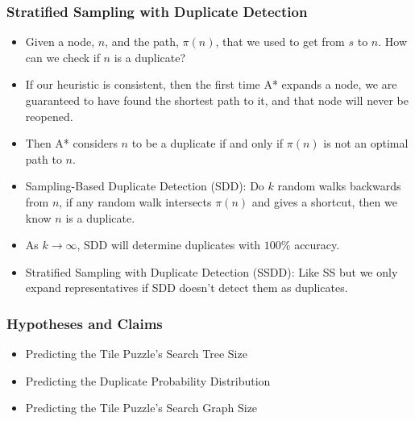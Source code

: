 \documentclass{beamer}
\begin{document}
\begin{frame}
  \frametitle{Stratified Sampling with Duplicate Detection}
  \begin{itemize}
  \item Given a node, \(n\), and the path, \(\pi(n)\), that we used to get from \(s\) to \(n\).
    How can we check if \(n\) is a duplicate?
  \item If our heuristic is consistent, then the first time A* expands a node, we are guaranteed to have found the shortest path to it, and that node will never be reopened.
  \item Then A* considers \(n\) to be a duplicate if and only if \(\pi(n)\) is not an optimal path to \(n\).
  \item Sampling-Based Duplicate Detection (SDD): Do \(k\) random walks backwards from \(n\),
    if any random walk intersects \(\pi(n)\) and gives a
    shortcut, then we know \(n\) is a duplicate.
  \item As \(k \rightarrow \infty\), SDD will determine duplicates with \(100\%\) accuracy.

  \item Stratified Sampling with Duplicate Detection (SSDD): Like SS but we only expand representatives if
    SDD doesn't detect them as duplicates.
    
  \end{itemize}
\end{frame}

\begin{frame}
  \frametitle{Hypotheses and Claims}
  \begin{itemize}
  \item Predicting the Tile Puzzle's Search Tree Size
  \item Predicting the Duplicate Probability Distribution
  \item Predicting the Tile Puzzle's Search Graph Size
  \end{itemize}
\end{frame}
\end{document}
